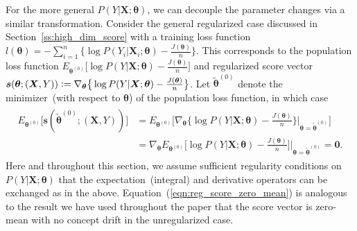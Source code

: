 \documentclass[twoside,11pt]{article}
\begin{document}
For the more general $P(Y|\bm{X};\bm{\theta})$, we can decouple the parameter changes via a similar transformation. Consider the general regularized case discussed in Section~\ref{ss:high_dim_score} with a training loss function $l(\bm{\theta}) = - \sum_{i=1}^n \big\{ \log{ P(Y_i|\bm{X}_i;\bm{\theta})} - \frac{J(\bm{\theta})}{n}\big\}$. This corresponds to the population loss function $E _{\bm { \theta}^{ (0)}} \big[ \log{ P(Y|\bm{X};\bm{\theta})} - \frac{J(\bm{\theta})}{n}\big]$ and regularized score vector $\bm{s}(\bm{\theta};(\bm{X},Y)) \vcentcolon= \nabla_{\bm{\theta}} \big\{ \log{ P(Y|\bm{X};\bm{\theta})} -\frac{J(\bm{\theta})}{n} \big\}$. Let $\tilde{ \bm { \theta}} ^{ (0)}$ denote the minimizer~(with respect to $\bm{\theta}$) of the population loss function, in which case
\begin{align}
\begin{aligned}
E _{\bm { \theta}^{ (0)}} \big[ \bm{s} (\tilde{ \bm { \theta}} ^{ (0)}; (\bm{X},Y) ) \big] &= E _{\bm { \theta}^{ (0)}} \big[ \nabla_{\bm{\theta}} \big\{ \log{ P(Y|\bm{X};\bm{\theta})} -\frac{J(\bm{\theta})}{n} \big\}|_{\bm{\theta} = \tilde{{\bm{\theta}}}^{(0)}} \big] \\
&= \nabla_{\bm{\theta}} E _{\bm { \theta}^{ (0)}} \big[ \log{P(Y|\bm{X};\bm{\theta})} -\frac{J(\bm{\theta})}{n} \big]\big|_{\bm{\theta} = \tilde{{\bm{\theta}}}^{(0)}} = \bm{0}. 
\end{aligned}
\label{eqn:reg_score_zero_mean}
\end{align}
Here and throughout this section, we assume sufficient regularity conditions on $P(Y|\bm{X};\bm{\theta})$ that the expectation~(integral) and derivative operators can be exchanged as in the above. Equation~(\ref{eqn:reg_score_zero_mean}) is analogous to the result we have used throughout the paper that the score vector is zero-mean with no concept drift in the unregularized case.
\end{document}
